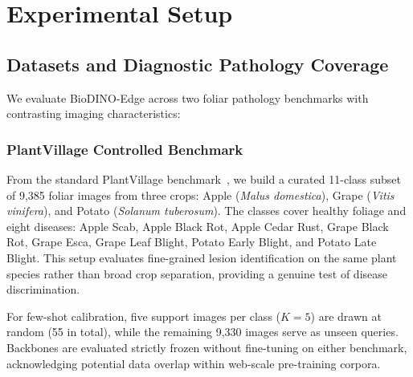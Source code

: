 \documentclass[preprint,12pt]{elsarticle}
\begin{document}
\section{Experimental Setup}
\label{sec:experiments_setup}

\subsection{Datasets and Diagnostic Pathology Coverage}
\label{sec:datasets}
We evaluate BioDINO-Edge across two foliar pathology benchmarks with contrasting imaging characteristics:

\subsubsection{PlantVillage Controlled Benchmark}
From the standard PlantVillage benchmark~\cite{mohanty2016plantvillage}, we build a curated 11-class subset of 9{,}385 foliar images from three crops: Apple (\textit{Malus domestica}), Grape (\textit{Vitis vinifera}), and Potato (\textit{Solanum tuberosum}). The classes cover healthy foliage and eight diseases: Apple Scab, Apple Black Rot, Apple Cedar Rust, Grape Black Rot, Grape Esca, Grape Leaf Blight, Potato Early Blight, and Potato Late Blight. This setup evaluates fine-grained lesion identification on the same plant species rather than broad crop separation, providing a genuine test of disease discrimination.

For few-shot calibration, five support images per class ($K=5$) are drawn at random (55 in total), while the remaining 9{,}330 images serve as unseen queries. Backbones are evaluated strictly frozen without fine-tuning on either benchmark, acknowledging potential data overlap within web-scale pre-training corpora.
\end{document}
